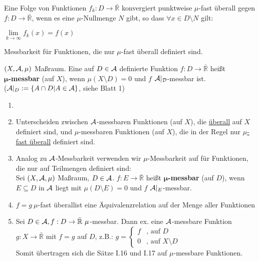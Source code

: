 \documentclass[11pt,a4paper,fleqn,openany]{report}
\begin{document}
    \begin{example}
      Eine Folge von Funktionen $f_k:D \to \bar{\mathbb{R}}$ konvergiert punktweise $\mu$-fast überall gegen $f: D \to \bar{\mathbb{R}}$, wenn es eine $\mu$-Nullmenge $N$ gibt, so dass $\forall x \in D \setminus N$ gilt:
      \begin{center}
        $\lim\limits_{k \to \infty} f_k(x) = f(x)$
      \end{center}
    \end{example}

    \begin{goal}
      Messbarkeit für Funktionen, die nur $\mu$-fast überall definiert sind.
    \end{goal}

    \begin{definition}
      $(X, \mathcal{A}, \mu)$ Maßraum. Eine auf $D \in \mathcal{A}$ definierte Funktion $f: D \to \bar{\mathbb{R}}$ heißt\\
      $\bm{\mu}$\textbf{-messbar} (auf $X$), wenn $\mu(X \setminus D) = 0$ und $f$ $\mathcal{A|_D}$-messbar ist.\\
      ($\mathcal{A}|_D := \{A \cap D | A \in \mathcal{A}\}$, siehe Blatt 1)
    \end{definition}

    \begin{remark}
      \begin{enumerate}
        \item[]
        \item Unterscheiden zwischen $\mathcal{A}$-messbaren Funktionen (auf $X$), die \underline{überall} auf $X$ definiert sind, und $\mu$-messbaren Funktionen (auf $X$), die in der Regel nur \underline{$\mu$-fast überall} definiert sind.
        \item Analog zu $\mathcal{A}$-Messbarkeit verwenden wir $\mu$-Messbarkeit auf für Funktionen, die nur auf Teilmengen definiert sind:\\
          Sei $(X, \mathcal{A}, \mu)$ Maßraum, $D \in \mathcal{A}$. $f: E \to \bar{\mathbb{R}}$ heißt \textbf{$\bm{\mu}$-messbar} (auf $D$), wenn $E \subseteq D$ in $\mathcal{A}$ liegt mit $\mu(D \setminus E) = 0$ und $f$ $\mathcal{A}|_E$-messbar.
        \item \glqq$f=g \ \mu$-fast überall\grqq ist eine Äquivalenzrelation auf der Menge aller Funktionen
        \item Sei $D \in \mathcal{A}, f: D \to \bar{\mathbb{R}}\ \mu$-messbar. Dann ex. eine $\mathcal{A}$-messbare Funktion $g: X \to \bar{\mathbb{R}}$ mit $f=g$ auf $D$, z.B.: $g = \begin{cases}
          f & \text{, auf } D\\
          0 & \text{, auf } X \setminus D 
        \end{cases}$\\
        Somit übertragen sich die Sätze I.16 und I.17 auf $\mu$-messbare Funktionen.
      \end{enumerate}
    \end{remark}
\end{document}

